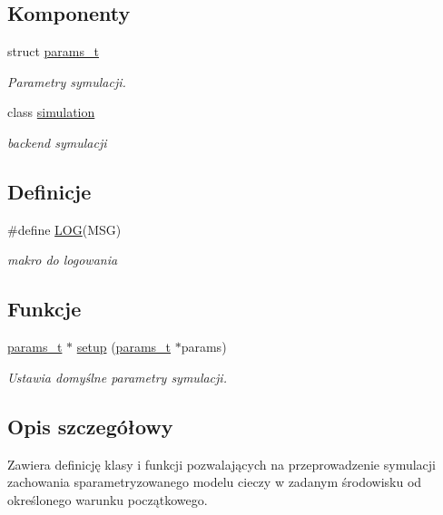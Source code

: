 \subsection*{Komponenty}
\begin{DoxyCompactItemize}
\item 
struct \hyperlink{structparams__t}{params\+\_\+t}
\begin{DoxyCompactList}\small\item\em Parametry symulacji. \end{DoxyCompactList}\item 
class \hyperlink{classsimulation}{simulation}
\begin{DoxyCompactList}\small\item\em backend symulacji \end{DoxyCompactList}\end{DoxyCompactItemize}
\subsection*{Definicje}
\begin{DoxyCompactItemize}
\item 
\#define \hyperlink{simulation_8hh_acbd91a8a9a62657e2252a0a1f7c876e1}{L\+O\+G}(M\+S\+G)
\begin{DoxyCompactList}\small\item\em makro do logowania \end{DoxyCompactList}\end{DoxyCompactItemize}
\subsection*{Funkcje}
\begin{DoxyCompactItemize}
\item 
\hyperlink{structparams__t}{params\+\_\+t} $\ast$ \hyperlink{simulation_8hh_abf5adaaaf59fb394dd7b3c5d4bcaaa1a}{setup} (\hyperlink{structparams__t}{params\+\_\+t} $\ast$params)
\begin{DoxyCompactList}\small\item\em Ustawia domyślne parametry symulacji. \end{DoxyCompactList}\end{DoxyCompactItemize}


\subsection{Opis szczegółowy}
Zawiera definicję klasy i funkcji pozwalających na przeprowadzenie symulacji zachowania sparametryzowanego modelu cieczy w zadanym środowisku od określonego warunku początkowego. 

